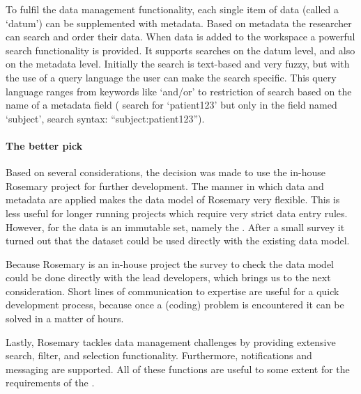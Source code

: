 To fulfil the data management functionality, each single item of data (called a `datum') can be supplemented with metadata.
Based on metadata the researcher can search and order their data.
When data is added to the workspace a powerful search functionality is provided.
It supports searches on the datum level, and also on the metadata level.
Initially the search is text-based and very fuzzy, but with the use of a query language the user can make the search specific.
This query language ranges from keywords like `and/or' to restriction of search based on the name of a metadata field (\eg{} search for `patient123' but only in the field named `subject', search syntax: ``subject:patient123'').

\paragraph{The better pick}
Based on several considerations, the decision was made to use the in-house Rosemary project for further development.
The manner in which data and metadata are applied makes  the data model of Rosemary very flexible.
This is less useful for longer running projects which require very strict data entry rules.
However, for the \ivfsystem{} data is an immutable set, namely the \projectdata{}.
After a small survey it turned out that the dataset could be used directly with the existing data model.

Because Rosemary is an in-house project the survey to check the data model could be done directly with the lead developers, which brings us to the next consideration.
Short lines of communication to expertise are useful for a quick development process, because once a (coding) problem is encountered it can be solved in a matter of hours.

Lastly, Rosemary tackles data management challenges by providing extensive search, filter, and selection functionality.
Furthermore, notifications and messaging are supported.
All of these functions are useful to some extent for the requirements of the \ivfsystem{}.